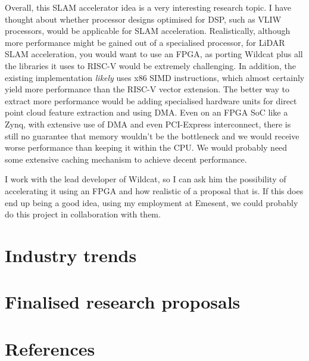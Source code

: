 \documentclass[12pt]{article}
\begin{document}
Overall, this SLAM accelerator idea is a very interesting research topic. I have thought about whether
processor designs optimised for DSP, such as VLIW processors, would be applicable for SLAM acceleration. 
Realistically, although more performance might be gained out of a specialised processor, for LiDAR SLAM
acceleration, you would want to use an FPGA, as porting Wildcat plus all the libraries it uses to RISC-V would
be extremely challenging. In addition, the existing implementation \textit{likely} uses x86 SIMD instructions,
which almost certainly yield more performance than the RISC-V vector extension. The better way to extract more
performance would be adding specialised hardware units for direct point cloud feature extraction and using
DMA. Even on an FPGA SoC like a Zynq, with extensive use of DMA and even PCI-Express interconnect, there is
still no guarantee that memory wouldn't be the bottleneck and we would receive worse performance than keeping
it within the CPU. We would probably need some extensive caching mechanism to achieve decent performance.


I work with the lead developer of Wildcat, so I can ask him the possibility of accelerating it using an FPGA
and how realistic of a proposal that is. If this does end up being a good idea, using my employment at
Emesent, we could probably do this project in collaboration with them.

%

\section{Industry trends}

\section{Finalised research proposals}

\section{References}
\printbibliography[heading=none]
\end{document}
